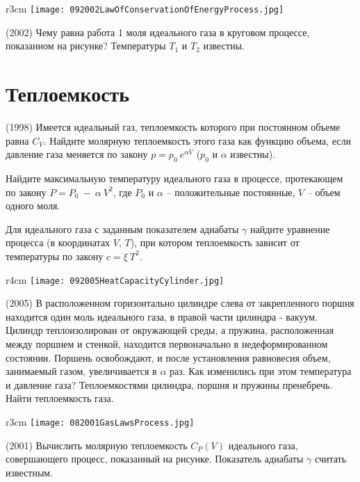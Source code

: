 \begin{wrapfigure}{r}{3cm}
\texttt{[image: 092002LawOfConservationOfEnergyProcess.jpg]}
\end{wrapfigure}

\AddProb (2002) Чему равна работа 1 моля идеального газа в круговом процессе, показанном на рисунке? Температуры $T_1$ и $T_2$ известны.

\section{Теплоемкость}

\AddProb (1998) Имеется идеальный газ, теплоемкость которого при постоянном объеме равна $C_V$. 
Найдите молярную теплоемкость этого газа как функцию объема, если давление газа меняется по закону $p=p_0~e^{\alpha V}$ ($p_0$ и $\alpha$ известны).

\AddProb Найдите максимальную температуру идеального газа в процессе, протекающем по закону $P=P_0~-~\alpha~V^2$, 
где $P_0$ и $\alpha$ -- положительные постоянные, $V$ -- объем одного моля.

\AddProb Для идеального газа с заданным показателем адиабаты $\gamma$ найдите уравнение процесса (в координатах $V$, $T$), 
при котором теплоемкость зависит от температуры по закону $c=\xi~T^2$.

\begin{wrapfigure}{r}{4cm}
\texttt{[image: 092005HeatCapacityCylinder.jpg]}
\end{wrapfigure}

\AddProb (2005) В расположенном горизонтально цилиндре слева от закрепленного поршня находится один моль идеального газа, 
в правой части цилиндра - вакуум. Цилиндр теплоизолирован от окружающей среды, а пружина, расположенная между поршнем и стенкой, 
находится первоначально в недеформированном состоянии. Поршень освобождают, и после установления равновесия объем, занимаемый газом, 
увеличивается в $\alpha$ раз. Как изменились при этом температура и давление газа? Теплоемкостями цилиндра, поршня и пружины пренебречь. 
Найти теплоемкость газа.

\begin{wrapfigure}{r}{3cm}
\texttt{[image: 082001GasLawsProcess.jpg]}
\end{wrapfigure}

\AddProb (2001) Вычислить молярную теплоемкость $C_P(V)$ идеального газа, совершающего процесс, показанный на рисунке. 
Показатель адиабаты $\gamma$ считать известным.